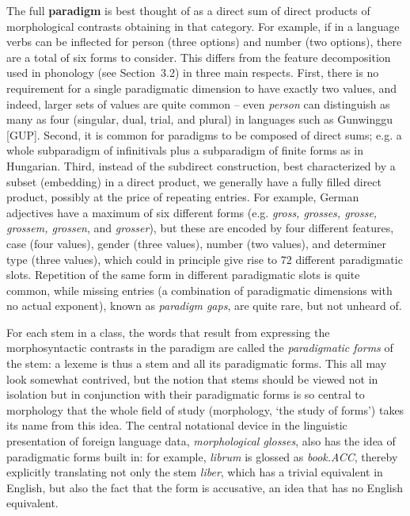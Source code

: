 The full {\bf paradigm} is best thought of as a direct sum of direct products
of morphological contrasts obtaining in that category. For example, if in a
language verbs can be inflected for person (three options) and number (two
options), there are a total of six forms to consider. This differs from the
feature decomposition used in phonology (see Section~3.2) in three main
respects.  First, there is no requirement for a single paradigmatic dimension
to have exactly two values, and indeed, larger sets of values are quite common
-- even {\it person} can distinguish as many as four (singular, dual, trial,
and plural) in languages such as Gunwinggu [GUP].
Second, it is common for paradigms to be composed of direct sums; e.g. a whole
subparadigm of infinitivals plus a subparadigm of finite forms as in
Hungarian. Third, instead of the subdirect construction, best characterized by
a subset (embedding) in a direct product, we generally have a fully filled
direct product, possibly at the price of repeating entries. For example,
German adjectives have a maximum of six different forms (e.g. {\it gross,
  grosses, grosse, grossem, grossen}, and {\it grosser}), but these are
encoded by four different features, case (four values), gender (three values),
number (two values), and determiner type (three values), which could in
principle give rise to 72 different paradigmatic slots. Repetition of the same
form in different paradigmatic slots is quite common, while missing entries (a
combination of paradigmatic dimensions with no actual exponent), known as {\it
  paradigm gaps}, are quite rare, but not unheard of.

For each stem in a class, the words that result from expressing the
morphosyntactic contrasts in the paradigm are called the {\it paradigmatic
forms} of the stem: a lexeme is thus a stem and all its paradigmatic forms.
This all may look somewhat contrived, but the notion that stems should be
viewed not in isolation but in conjunction with their paradigmatic forms is so
central to morphology that the whole field of study (morphology, `the study of
forms') takes its name from this idea. The central notational device in the
linguistic presentation of foreign language data, {\it morphological glosses},
 also has the idea of paradigmatic forms built in: for example,
{\it librum} is glossed as {\it book.ACC}, thereby explicitly translating not
only the stem {\it liber}, which has a trivial equivalent in English, but also
the fact that the form is accusative, an idea that has no English equivalent. 

